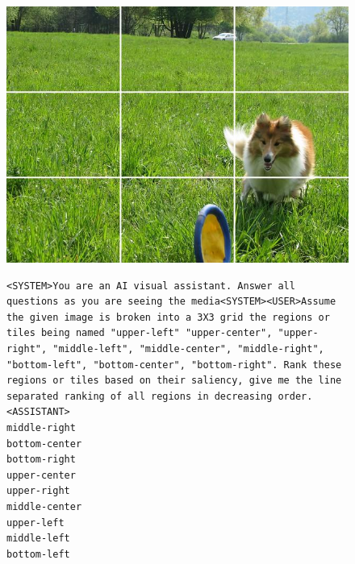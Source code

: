 \begin{figure}[!h]
\begin{minipage}[c]{0.3\textwidth}
        \centering
        \includegraphics[width=\textwidth]{images/listing-image-grid.jpg}
    \end{minipage}
    \hfill
    \begin{minipage}[c]{0.67\textwidth}
\small
\centering
\scriptsize
\begin{lstlisting}[caption={Perceptual Signal Instruction fine-tuning template for the image: \url{http://farm6.staticflickr.com/5106/5670500150_e035dd2d30_z.jpg}},frame=single,breaklines=true,basicstyle=\scriptsize, label={lst:blift-template-perceptual-region}]
<SYSTEM>You are an AI visual assistant. Answer all questions as you are seeing the media<SYSTEM><USER>Assume the given image is broken into a 3X3 grid the regions or tiles being named "upper-left" "upper-center", "upper-right", "middle-left", "middle-center", "middle-right", "bottom-left", "bottom-center", "bottom-right". Rank these regions or tiles based on their saliency, give me the line separated ranking of all regions in decreasing order.
<ASSISTANT>
middle-right
bottom-center
bottom-right
upper-center
upper-right
middle-center
upper-left
middle-left
bottom-left
\end{lstlisting}
\end{minipage}
\label{fig:listing-perception-image-region}
\end{figure}






